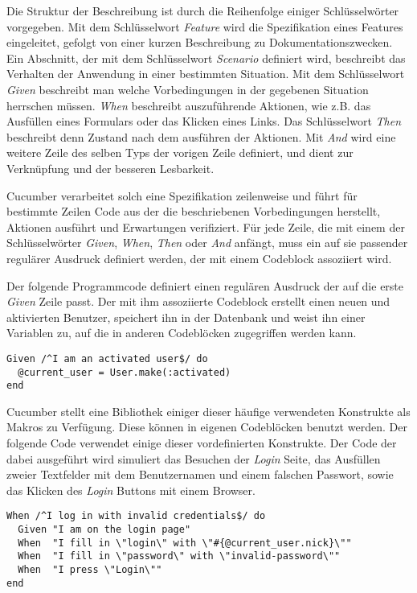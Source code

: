 Die Struktur der Beschreibung ist durch die Reihenfolge einiger
Schlüssel\-wörter vorgegeben. Mit dem Schlüsselwort \textit{Feature}
wird die Spezifikation eines Features eingeleitet, gefolgt von einer
kurzen Beschreibung zu Dokumentationszwecken. Ein Abschnitt, der mit
dem Schlüsselwort \textit{Scenario} definiert wird, beschreibt das
Verhalten der Anwendung in einer bestimmten Situation. Mit dem
Schlüsselwort \textit{Given} beschreibt man welche Vorbedingungen in
der gegebenen Situation herrschen müssen. \textit{When} beschreibt
auszuführende Aktionen, wie z.B. das Ausfüllen eines Formulars oder
das Klicken eines Links. Das Schlüsselwort \textit{Then} beschreibt
denn Zustand nach dem ausführen der Aktionen. Mit \textit{And} wird
eine weitere Zeile des selben Typs der vorigen Zeile definiert, und
dient zur Verknüpfung und der besseren Lesbarkeit.

Cucumber verarbeitet solch eine Spezifikation zeilenweise und führt
für bestimmte Zeilen Code aus der die beschriebenen Vorbedingungen
herstellt, Aktionen ausführt und Erwartungen verifiziert. Für jede
Zeile, die mit einem der Schlüsselwörter \textit{Given},
\textit{When}, \textit{Then} oder \textit{And} anfängt, muss ein auf
sie passender regulärer Ausdruck definiert werden, der mit einem
Codeblock assoziiert wird.

Der folgende Programmcode definiert einen regulären Ausdruck der auf
die erste \textit{Given} Zeile passt. Der mit ihm assoziierte Codeblock
erstellt einen neuen und aktivierten Benutzer, speichert ihn in der
Datenbank und weist ihn einer Variablen zu, auf die in anderen
Codeblöcken zugegriffen werden kann.

\begin{lstlisting}
Given /^I am an activated user$/ do
  @current_user = User.make(:activated)
end
\end{lstlisting}

Cucumber stellt eine Bibliothek einiger dieser häufige verwendeten
Konstrukte als Makros zu Verfügung. Diese können in eigenen
Codeblöcken benutzt werden. Der folgende Code verwendet einige dieser
vordefinierten Konstrukte. Der Code der dabei ausgeführt wird
simuliert das Besuchen der \textit{Login} Seite, das Ausfüllen zweier
Textfelder mit dem Benutzernamen und einem falschen Passwort, sowie
das Klicken des \textit{Login} Buttons mit einem Browser.

\begin{lstlisting}
When /^I log in with invalid credentials$/ do
  Given "I am on the login page"
  When  "I fill in \"login\" with \"#{@current_user.nick}\""
  When  "I fill in \"password\" with \"invalid-password\""
  When  "I press \"Login\""
end
\end{lstlisting}

